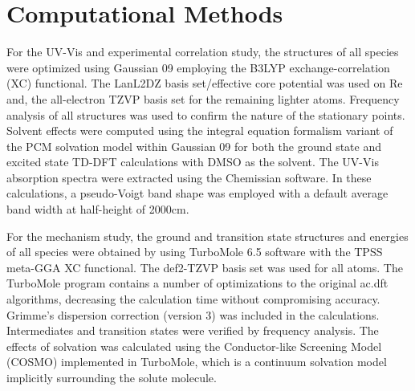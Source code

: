 \section{Computational Methods}\label{sec.compmethods}
For the UV-Vis and experimental correlation study, the structures of all species were optimized using Gaussian 09\autocite{gaussian} employing the B3LYP\autocite{becke1993, lee1988}  exchange-correlation (XC) functional. The LanL2DZ basis set/effective core potential\autocite{hay1985} was used on Re and, the all-electron TZVP basis set\autocite{schafer1994} for the remaining lighter atoms. Frequency analysis of all structures was used to confirm the nature of the stationary points. Solvent effects were computed using the integral equation formalism variant of the PCM solvation model within Gaussian 09 for both the ground state and excited state TD-DFT calculations with DMSO as the solvent\autocite{tomasi2005, scalmani2006}. The UV-Vis absorption spectra were extracted using the Chemissian software\autocite{chemissian}. In these calculations, a pseudo-Voigt band shape was employed with a default average band width at half-height of 2000cm.

For the mechanism study, the ground and transition state structures and energies of all species were obtained by using TurboMole 6.5 software\autocite{turbomole, ahlrichs1989} with the TPSS meta-GGA XC functional\autocite{tao2003}. The def2-TZVP basis set was used for all atoms\autocite{schafer1994, weigend2005}. The TurboMole program contains a number of optimizations to the original \gls{ac.dft} algorithms\autocite{haase1993, treutler1995, eichkorn1997, eichkorn1995, sierka2003, deglmann2004, weigend2002, vonarnim1998, ahlrichs2004}, decreasing the calculation time without compromising accuracy. Grimme's dispersion correction (version 3) was included in the calculations\autocite{grimme2010}. Intermediates and transition states were verified by frequency analysis\autocite{deglmann2004, deglmann2002, grimme2002}. The effects of solvation was calculated using the Conductor-like Screening Model (COSMO) implemented in TurboMole\autocite{klamt1993}, which is a continuum solvation model implicitly surrounding the solute molecule.

